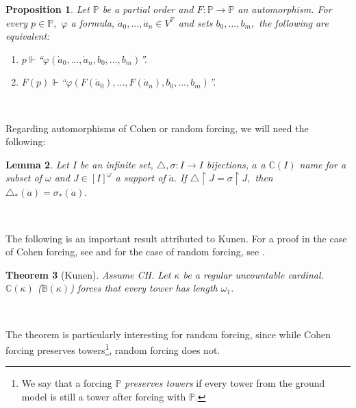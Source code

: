 \documentclass{article}%
\newtheorem{theorem}{Theorem}
\newtheorem{lemma}[theorem]{Lemma}
\newtheorem{proposition}[theorem]{Proposition}
\begin{document}
\begin{proposition}
Let $\mathbb{P}$ be a partial order and $F:\mathbb{P\longrightarrow P}$ an
automorphism. For every $p\in\mathbb{P},$ $\varphi$ a formula, $\dot{a}%
_{0},...,\dot{a}_{n}\in V^{\mathbb{P}}$ and sets $b_{0},...,b_{m},$ the
following are equivalent: \label{Prop formula isomorfismo}

\begin{enumerate}
\item $p\Vdash$\textquotedblleft$\varphi(\dot{a}_{0},...,\dot{a}_{n}%
,b_{0},...,b_{m})$\textquotedblright.

\item $F\left(  p\right)  \Vdash$\textquotedblleft$\varphi(F\left(  \dot
{a}_{0}\right)  ,...,F\left(  \dot{a}_{n}\right)  ,b_{0},...,b_{m}%
)$\textquotedblright.\ 
\end{enumerate}
\end{proposition}

\qquad\qquad\ \ \ 

Regarding automorphisms of Cohen or random forcing, we will need the following:

\begin{lemma}
Let $I$ be an infinite set, $\triangle,\sigma:I\longrightarrow I$ bijections,
$\dot{a}$ a $\mathbb{C}\left(  I\right)  $ name for a subset of $\omega$ and
$J\in\left[  I\right]  ^{\omega}$ a support of $\dot{a}.$ If $\triangle
\upharpoonright J=\sigma\upharpoonright J,$ then $\triangle_{\ast}(\dot
{a})=\sigma_{\ast}(\dot{a}).$ \label{automorfismo coinciden}
\end{lemma}

\qquad\ \ \ \ \ \ 

The following is an important result attributed to Kunen. For a proof in the
case of Cohen forcing, see \cite{Kunen} and for the case of random forcing,
see \cite{MeasuresinducebbyForcingnames}.

\begin{theorem}
[Kunen]Assume \textsf{CH. }Let $\kappa$ be a regular uncountable cardinal.
$\mathbb{C}\left(  \kappa\right)  $ ($\mathbb{B}\left(  \kappa\right)  $)
forces that every tower has length $\omega_{1}.$ \label{KunenTorres}
\end{theorem}

\qquad\qquad\ \ \ 

The theorem is particularly interesting for random forcing, since while Cohen
forcing preserves towers\footnote{We say that a forcing $\mathbb{P}$
\emph{preserves towers }if every tower from the ground model is still a tower
after forcing with $\mathbb{P}.$}, random forcing does not.
\end{document}
